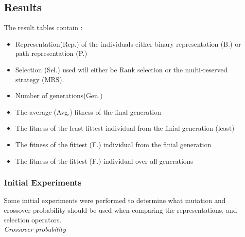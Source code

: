 \documentclass[10pt,a4paper,openbib]{article}
\begin{document}
\begin{multicols}{2}
\subsection{Results}

The result tables contain : 
\begin{itemize}
\item Representation(Rep.) of the individuals either binary representation (B.) or path representation (P.) 
\item Selection (Sel.) used will either be Rank selection or the multi-reserved strategy (MRS).
\item Number of generations(Gen.) 
\item The average (Avg.) fitness of the final generation 
\item The fitness of the least fittest individual from the finial generation (least)
\item The fitness of the fittest (F.) individual from the finial generation 
\item The fitness of the fittest (F.) individual over all generations
\end{itemize}  

\subsubsection{Initial Experiments}

Some initial experiments were performed to determine what mutation and crossover probability should be used when comparing the representations, and selection operators. \\

\noindent \textit{Crossover probability} \\


\end{multicols}
\end{document}
